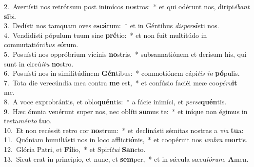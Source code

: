 {2.~}Avertísti nos retrórsum post inimícos \textbf{no}stros:~* et qui odérunt nos, diripi\textit{é}\textit{bant} \textbf{si}bi.\\
{3.~}Dedísti nos tamquam oves e\textbf{scá}rum:~* et in Géntibus \textit{di}\textit{sper}\textbf{sí}sti nos.\\
{4.~}Vendidísti pópulum tuum sine \textbf{pré}tio:~* et non fuit multitúdo in commutatióni\textit{bus} \textit{e}\textbf{ó}rum.\\
{5.~}Posuísti nos oppróbrium vicínis \textbf{no}stris,~* subsannatiónem et derísum his, qui sunt in circú\textit{i}\textit{tu} \textbf{no}stro.\\
{6.~}Posuísti nos in similitúdinem \textbf{Gén}tibus:~* commotiónem cápi\textit{tis} \textit{in} \textbf{pó}pulis.\\
{7.~}Tota die verecúndia mea contra \textbf{me} est,~* et confúsio faciéi meæ coo\textit{pé}\textit{ru}\textbf{it} me.\\
{8.~}A voce exprobrántis, et oblo\textbf{quén}tis:~* a fácie inimíci, et \textit{per}\textit{se}\textbf{quén}tis.\\
{9.~}Hæc ómnia venérunt super nos, nec oblíti \textbf{su}mus te:~* et iníque non égimus in testa\textit{mén}\textit{to} \textbf{tu}o.\\
{10.~}Et non recéssit retro cor \textbf{no}strum:~* et declinásti sémitas nostras a \textit{vi}\textit{a} \textbf{tu}a:\\
{11.~}Quóniam humiliásti nos in loco afflicti\textbf{ó}nis,~* et coopéruit nos \textit{um}\textit{bra} \textbf{mor}tis.\\
{12.~}Glória Patri, et \textbf{Fí}lio,~* et Spirí\textit{tu}\textit{i} \textbf{San}cto.\\
{13.~}Sicut erat in princípio, et nunc, et \textbf{sem}per,~* et in sǽcula sæcu\textit{ló}\textit{rum}. \textbf{A}men.\\
